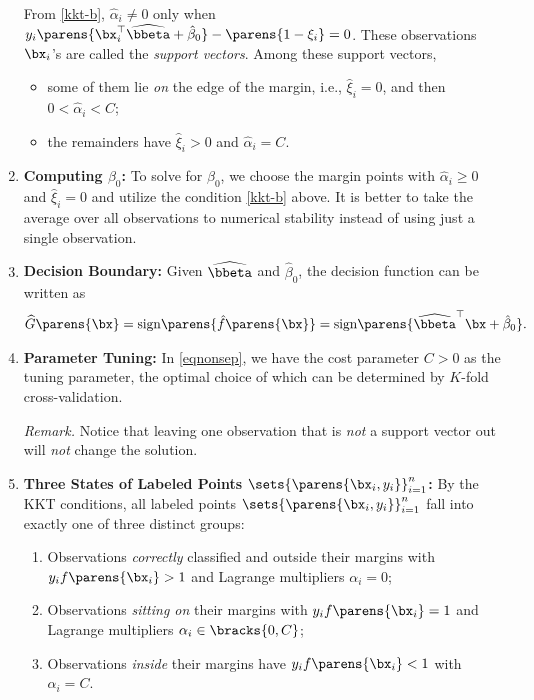\documentclass[12pt]{article}
\begin{document}
\begin{enumerate}[label=\textbf{\arabic*.}]
	From \ref{kkt-b}, $\hat{\alpha}_i \ne 0$ only when $y_i \parens{\bx_i^\top \widehat{\bbeta} + \hat{\beta}_0} - \parens{1 - \xi_i} = 0$. These observations $\bx_i$'s are called the \textit{support vectors}. Among these support vectors, 
	\begin{itemize}
		\item some of them lie \emph{on} the edge of the margin, i.e., $\hat{\xi}_i = 0$, and then $ 0 < \hat{\alpha}_i < C$; 
		\item the remainders have $\hat{\xi}_i > 0$ and $\hat{\alpha}_i = C$. 
	\end{itemize}
	
	\item \textbf{Computing $\beta_0$:} To solve for $\beta_0$, we choose the margin points with $\hat{\alpha}_i \ge 0$ and $\hat{\xi}_i = 0$ and utilize the condition \ref{kkt-b} above. It is better to take the average over all observations to numerical stability instead of using just a single observation. 
	
	\item \textbf{Decision Boundary:} Given $\widehat{\bbeta}$ and $\hat{\beta}_0$, the decision function can be written as 
	\begin{align*}
		\widehat{G} \parens{\bx} = \mathrm{sign} \parens{\hat{f} \parens{\bx}} = \mathrm{sign} \parens{\widehat{\bbeta}^\top \bx + \hat{\beta}_0}. 
	\end{align*}
	
	\item \textbf{Parameter Tuning:} In \eqref{eqnonsep}, we have the cost parameter $C > 0$ as the tuning parameter, the optimal choice of which can be determined by $K$-fold cross-validation. 
	
	\textit{Remark.} Notice that leaving one observation that is \emph{not} a support vector out will \emph{not} change the solution. 
	
	\item \textbf{Three States of Labeled Points $\sets{\parens{\bx_i, y_i}}_{i=1}^n$:} By the KKT conditions, all labeled points $\sets{\parens{\bx_i, y_i}}_{i=1}^n$ fall into exactly one of three distinct groups: 
	\begin{enumerate}
		\item Observations \textit{correctly} classified and outside their margins with $y_i f \parens{\bx_i} > 1 $ and Lagrange multipliers $\alpha_i = 0$; 
		\item Observations \textit{sitting on} their margins with $y_i f \parens{\bx_i} = 1$ and Lagrange multipliers $\alpha_i \in \bracks{0, C}$; 
		\item Observations \textit{inside} their margins have $y_i f \parens{\bx_i} < 1$ with $ \alpha_i = C$. 
	\end{enumerate}

\end{enumerate}
\end{document}
